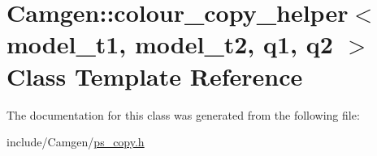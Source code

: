 \hypertarget{a00069}{}\section{Camgen\+:\+:colour\+\_\+copy\+\_\+helper$<$ model\+\_\+t1, model\+\_\+t2, q1, q2 $>$ Class Template Reference}
\label{a00069}


The documentation for this class was generated from the following file\+:\begin{DoxyCompactItemize}
\item 
include/\+Camgen/\hyperlink{a00740}{ps\+\_\+copy.\+h}\end{DoxyCompactItemize}
